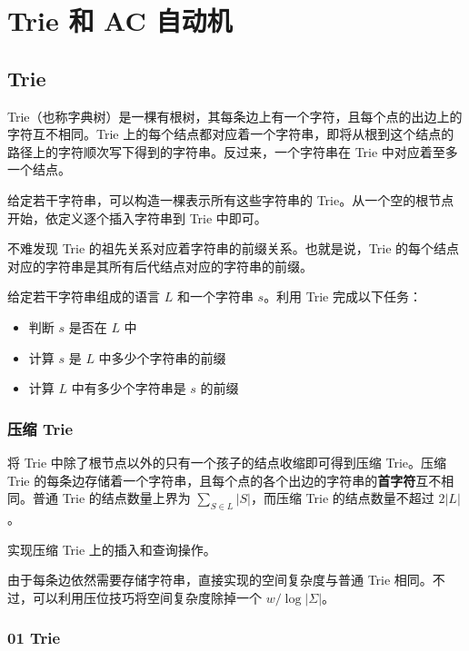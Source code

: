 \chapter{Trie 和 AC 自动机}

\section{Trie}

Trie（也称字典树）是一棵有根树，其每条边上有一个字符，且每个点的出边上的字符互不相同。Trie 上的每个结点都对应着一个字符串，即将从根到这个结点的路径上的字符顺次写下得到的字符串。反过来，一个字符串在 Trie 中对应着至多一个结点。

给定若干字符串，可以构造一棵表示所有这些字符串的 Trie。从一个空的根节点开始，依定义逐个插入字符串到 Trie 中即可。


不难发现 Trie 的祖先关系对应着字符串的前缀关系。也就是说，Trie 的每个结点对应的字符串是其所有后代结点对应的字符串的前缀。

\begin{exercise}
    给定若干字符串组成的语言 $L$ 和一个字符串 $s$。利用 Trie 完成以下任务：
    \begin{itemize}
        \item 判断 $s$ 是否在 $L$ 中
        \item 计算 $s$ 是 $L$ 中多少个字符串的前缀
        \item 计算 $L$ 中有多少个字符串是 $s$ 的前缀
    \end{itemize}
\end{exercise}

\subsection{压缩 Trie}

将 Trie 中除了根节点以外的只有一个孩子的结点收缩即可得到压缩 Trie。压缩 Trie 的每条边存储着一个字符串，且每个点的各个出边的字符串的\textbf{首字符}互不相同。普通 Trie 的结点数量上界为 $\sum_{S\in L} |S|$，而压缩 Trie 的结点数量不超过 $2|L|$。

\begin{exercise}
    实现压缩 Trie 上的插入和查询操作。
\end{exercise}

由于每条边依然需要存储字符串，直接实现的空间复杂度与普通 Trie 相同。不过，可以利用压位技巧将空间复杂度除掉一个 $w/\log|\Sigma|$。

\subsection{01 Trie}

